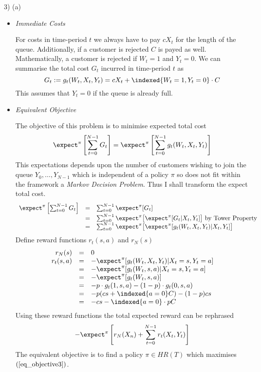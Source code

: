 \documentclass[11pt,a4paper]{article}
\begin{document}
\begin{answer}{3) (a)}
\begin{itemize}
\begin{enumerate}
    \end{enumerate}

    \item \textit{Immediate Costs}
    \par For costs in time-period $t$ we always have to pay $cX_t$ for the length of the queue. Additionally, if a customer is rejected $C$ is payed as well. Mathematically, a customer is rejected if $W_t=1$ and $Y_t=0$. We can summarise the total cost $G_t$ incurred in time-period $t$ as
    \[ G_t:=g_t(W_t,X_t,Y_t)=cX_t+\indexed\{W_t=1,Y_t=0\}\cdot C \]
    This assumes that $Y_t=0$ if the queue is already full.

    \item \textit{Equivalent Objective}
    \par The objective of this problem is to minimise expected total cost
    \[ \expect^\pi\left[\sum_{t=0}^{N-1}G_t\right]=\expect^\pi\left[\sum_{t=0}^{N-1}g_t(W_t,X_t,Y_t)\right] \]
    This expectations depends upon the number of customers wishing to join the queue $Y_0,\dots,Y_{N-1}$ which is independent of a policy $\pi$ so does not fit within the framework a \textit{Markov Decision Problem}. Thus I shall transform the expect total cost.
    \[\begin{array}{rcl}
      \expect^\pi\left[\sum_{t=0}^{N-1}G_t\right]&=&\sum_{t=0}^{N-1}\expect^\pi[G_t]\\
      &=&\sum_{t=0}^{N-1}\expect^\pi\big[\expect^\pi[G_t|X_t,Y_t]\big]\text{ by Tower Property}\\
      &=&\sum_{t=0}^{N-1}\expect^\pi\big[\expect^\pi[g_t(W_t,X_t,Y_t)|X_t,Y_t]\big]\\
    \end{array}\]
    Define reward functions $r_t(s,a)$ and $r_N(s)$
    \[\begin{array}{rcl}
      r_N(s)&=&0\\
      r_t(s,a)&=&-\expect^\pi[g_t(W_t,X_t,Y_t)|X_t=s,Y_t=a]\\
      &=&-\expect^\pi[g_t(W_t,s,a)|X_t=s,Y_t=a]\\
      &=&-\expect^\pi[g_t(W_t,s,a)]\\
      &=&-p\cdot g_t(1,s,a)-(1-p)\cdot g_t(0,s,a)\\
      &=&-p(cs+\indexed\{a=0\}C)-(1-p)cs\\
      &=&-cs-\indexed\{a=0\}\cdot pC
    \end{array}\]
    Using these reward functions the total expected reward can be rephrased
    \begin{equation} \label{eq_objective3}
      -\expect^\pi\left[r_N(X_n)+\sum_{t=0}^{N-1}r_t(X_t,Y_t)\right]
    \end{equation}
    The equivalent objective is to find a policy $\pi\in HR(T)$ which maximises $(\ref{eq_objective3})$.
  \end{itemize}
\end{answer}
\end{document}
